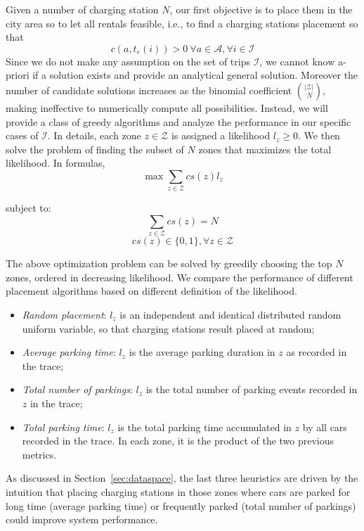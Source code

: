 Given a number of charging station $N$, our first objective is to place them in the city area so to let all rentals feasible, i.e., to find a charging stations placement so that
\[
c(a,t_e(i))>0\ \forall a \in \mathcal{A}, \forall  i \in \mathcal{I}
\]
Since we do not make any assumption on the set of trips $\mathcal{I}$, we cannot know a-priori if a solution exists and provide an analytical general solution. Moreover the number of candidate solutions increases as the binomial coefficient ${\left\vert{\mathcal{Z}}\right\vert}\choose\ N$, making ineffective to numerically compute all possibilities. Instead, we will provide a class of greedy algorithms and analyze the performance in our specific cases of $\mathcal{I}$.
In details, each zone $z\in\mathcal{Z}$ is assigned a likelihood $l_z \geq 0$.
We then solve the problem of finding the subset of $N$ zones that maximizes the total likelihood. In formulas, 
$$\max \sum_{z\in\mathcal{Z}} cs(z)l_z$$

subject to:
$$\sum_{z\in\mathcal{Z}} cs(z) = N$$
$$cs(z)\in \{0,1\},  \forall z \in \mathcal{Z}$$

The above optimization problem can be solved by greedily choosing the top $N$ zones, ordered in decreasing likelihood. We compare the performance of different placement algorithms based on different definition of the likelihood.
\begin{itemize}
  \item{\it Random placement}: $l_z$ is an independent and identical distributed random uniform variable, so that charging stations result placed at random;
  \item{\it Average parking time}: $l_z$ is the average parking duration in $z$ as recorded in the trace;
  \item{\it Total number of parkings}: $l_z$ is the total number of parking events recorded in $z$ in the trace;
  \item{\it Total parking time}: $l_z$ is the total parking time accumulated in $z$ by all cars recorded in the trace. In each zone, it is the product of the two previous metrics.
\end{itemize}
As discussed in Section~\ref{sec:dataspace}, the last three heuristics are driven by the intuition that placing charging stations in those zones where cars are parked for long time (average parking time) or frequently parked (total number of parkings) could improve system performance.

